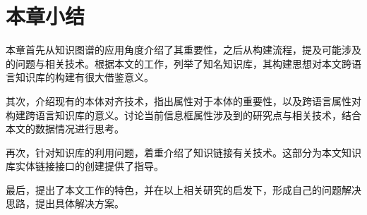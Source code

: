 \section{本章小结}
本章首先从知识图谱的应用角度介绍了其重要性，之后从构建流程，提及可能涉及的问题与相关技术。根据本文的工作，列举了知名知识库，其构建思想对本文跨语言知识库的构建有很大借鉴意义。

其次，介绍现有的本体对齐技术，指出属性对于本体的重要性，以及跨语言属性对构建跨语言知识库的意义。讨论当前信息框属性涉及到的研究点与相关技术，结合本文的数据情况进行思考。

再次，针对知识库的利用问题，着重介绍了知识链接有关技术。这部分为本文知识库实体链接接口的创建提供了指导。

最后，提出了本文工作的特色，并在以上相关研究的启发下，形成自己的问题解决思路，提出具体解决方案。

